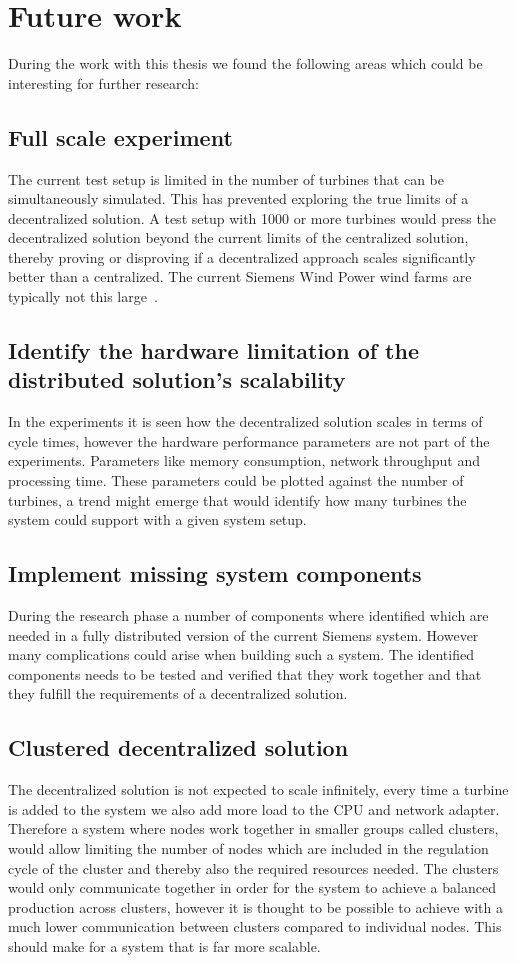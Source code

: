 \chapter{Future work}
\label{sec:futWork}
During the work with this thesis we found the following areas which could be interesting for further research:

\section{Full scale experiment}
The current test setup is limited in the number of turbines that can be simultaneously simulated. This has prevented exploring the true limits of a decentralized solution.
A test setup with 1000 or more turbines would press the decentralized solution beyond the current limits of the centralized solution, thereby proving or disproving if a decentralized approach scales significantly better than a centralized. The current Siemens Wind Power wind farms are typically not this large~\cite{simensOnShoreProjects,simensOffShoreProjects}.


\section{Identify the hardware limitation of the distributed solution's scalability}
In the experiments it is seen how the decentralized solution scales in terms of cycle times, however the hardware performance parameters are not part of the experiments.
Parameters like memory consumption, network throughput and processing time. These parameters could be plotted against the number of turbines, a trend might emerge that would identify how many turbines the system could support with a given system setup.


\section{Implement missing system components}
During the research phase a number of components where identified which are needed in a fully distributed version of the current Siemens system.
However many complications could arise when building such a system. The identified components needs to be tested and verified that they work together and that they fulfill the requirements of a decentralized solution. 


\section{Clustered decentralized solution}
The decentralized solution is not expected to scale infinitely, every time a turbine is added to the system we also add more load to the CPU and network adapter.
Therefore a system where nodes work together in smaller groups called clusters, would allow limiting the number of nodes which are included in the regulation cycle of the cluster and thereby also the required resources needed. 
The clusters would only communicate together in order for the system to achieve a balanced production across clusters, however it is thought to be possible to achieve with a much lower communication between clusters compared to individual nodes.
This should make for a system that is far more scalable.


